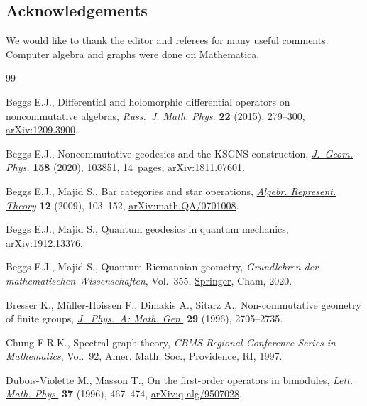 \documentclass[10pt,a4paper]{amsart}
\numberwithin{equation}{section}
\newcommand{\<}{\langle}
\renewcommand{\>}{\rangle}
\begin{document}
\subsection*{Acknowledgements}

We would like to thank the editor and referees for many useful comments. Computer algebra and graphs were done on Mathematica.


\begin{thebibliography}{99}
\footnotesize\itemsep=0pt

Beggs E.J., Differential and holomorphic differential operators on
 noncommutative algebras, \href{https://doi.org/10.1134/S1061920815030012}{\textit{Russ.~J. Math. Phys.}} \textbf{22} (2015),
 279--300, \href{https://arxiv.org/abs/1209.3900}{arXiv:1209.3900}.

Beggs E.J., Noncommutative geodesics and the {KSGNS} construction,
 \href{https://doi.org/10.1016/j.geomphys.2020.103851}{\textit{J.~Geom. Phys.}} \textbf{158} (2020), 103851, 14~pages, \href{https://arxiv.org/abs/1811.07601}{arXiv:1811.07601}.

Beggs E.J., Majid S., Bar categories and star operations, \href{https://doi.org/10.1007/s10468-009-9141-x}{\textit{Algebr.
 Represent. Theory}} \textbf{12} (2009), 103--152, \href{https://arxiv.org/abs/math.QA/0701008}{arXiv:math.QA/0701008}.

Beggs E.J., Majid S., Quantum geodesics in quantum mechanics,
 \href{https://arxiv.org/abs/1912.13376}{arXiv:1912.13376}.

Beggs E.J., Majid S., Quantum {R}iemannian geometry, \textit{Grundlehren der
 mathematischen Wissenschaften}, Vol.~355, \href{https://doi.org/10.1007/978-3-030-30294-8}{Springer}, Cham, 2020.

Bresser K., M\"uller-Hoissen F., Dimakis A., Sitarz A., Non-commutative
 geometry of finite groups, \href{https://doi.org/10.1088/0305-4470/29/11/010}{\textit{J.~Phys.~A: Math. Gen.}} \textbf{29}
 (1996), 2705--2735.

Chung F.R.K., Spectral graph theory, \textit{CBMS Regional Conference Series in
 Mathematics}, Vol.~92, Amer. Math. Soc., Providence, RI, 1997.

Dubois-Violette M., Masson T., On the first-order operators in bimodules,
 \href{https://doi.org/10.1007/BF00312677}{\textit{Lett. Math. Phys.}} \textbf{37} (1996), 467--474,
 \href{https://arxiv.org/abs/q-alg/9507028}{arXiv:q-alg/9507028}.


\end{thebibliography}
\end{document}
